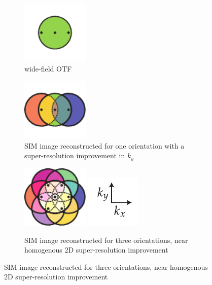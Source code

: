 \begin{figure}
    \centering
    \begin{subfigure}[t]{0.25\textwidth}
        \centering
        \includegraphics[height=3cm]{./sim/otf}
        \caption{\Gls{wide-field} \gls{OTF}}\label{fig:sim_otf}
    \end{subfigure}\hfill
    \begin{subfigure}[t]{0.25\textwidth}
        \centering
        \includegraphics[height=3cm]{./sim/third_flower}
        \caption{\gls{SIM} image reconstructed for one orientation with a \gls{super-resolution} improvement in \(k_y \)}\label{fig:sim_third_flower}
    \end{subfigure}\hfill
    \begin{subfigure}[t]{0.35\textwidth}
        \centering
        \includegraphics[height=3cm]{./sim/full_flower_alt}
        \includegraphics{./sim/xy_coordinates}%
        \caption{\gls{SIM} image reconstructed for three orientations, near homogenous 2D \gls{super-resolution} improvement}\label{fig:sim_full_flower}
    \end{subfigure}

\end{figure}
